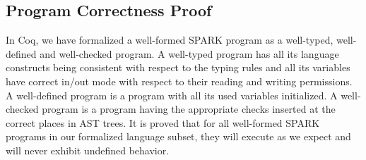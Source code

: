 \subsection{Program Correctness Proof}
In Coq, we have formalized a well-formed SPARK program as a well-typed, well-defined
and well-checked program. 
A well-typed program has all its language constructs being consistent with respect to the 
typing rules and all its variables have correct in/out mode with respect to their reading 
and writing permissions. 
A well-defined program is a program with all its used variables initialized.
A well-checked program is a program having the appropriate checks inserted at the correct places
in AST trees.
It is proved that for all well-formed SPARK programs in our formalized language subset, they will
execute as we expect and will never exhibit undefined behavior.
